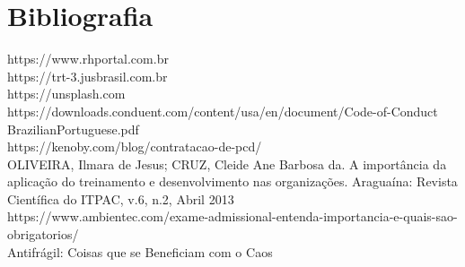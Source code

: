 \section{Bibliografia}
\noindent
{\large 
https://www.rhportal.com.br\\

\noindent https://trt-3.jusbrasil.com.br\\

\noindent https://unsplash.com\\

\noindent https://downloads.conduent.com/content/usa/en/document/Code-of-Conduct BrazilianPortuguese.pdf\\

\noindent https://kenoby.com/blog/contratacao-de-pcd/\\

\noindent OLIVEIRA, Ilmara de Jesus; CRUZ, Cleide Ane Barbosa da. A importância da aplicação do treinamento e desenvolvimento nas organizações. Araguaína: Revista Científica do ITPAC, v.6, n.2, Abril 2013\\

\noindent https://www.ambientec.com/exame-admissional-entenda-importancia-e-quais-sao-obrigatorios/\\

\noindent Antifrágil: Coisas que se Beneficiam com o Caos}
